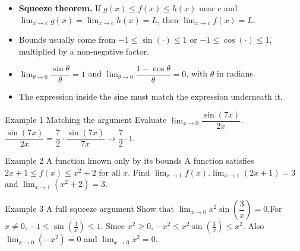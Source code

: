 \documentclass[11pt]{article}
\begin{document}

\begin{ideabox}
\begin{itemize}[leftmargin=*,itemsep=2pt,topsep=2pt]
  \item \textbf{Squeeze theorem.} If $g(x)\le f(x)\le h(x)$ near $c$ and $\displaystyle\lim_{x\to c}g(x)=\displaystyle\lim_{x\to c}h(x)=L$, then $\displaystyle\lim_{x\to c}f(x)=L$.
  \item Bounds usually come from $-1\le\sin(\cdot)\le1$ or $-1\le\cos(\cdot)\le1$, multiplied by a non-negative factor.
  \item $\displaystyle\lim_{\theta\to 0}\dfrac{\sin\theta}{\theta}=1$ and $\displaystyle\lim_{\theta\to 0}\dfrac{1-\cos\theta}{\theta}=0$, with $\theta$ in radians.
  \item The expression inside the sine must match the expression underneath it.
\end{itemize}
\end{ideabox}

\begin{example}{Example 1 \textperiodcentered{} Matching the argument}
Evaluate $\displaystyle\lim_{x\to 0}\dfrac{\sin(7x)}{2x}$.\soln $\dfrac{\sin(7x)}{2x}=\dfrac72\cdot\dfrac{\sin(7x)}{7x}\to\dfrac72\cdot1$.
\end{example}

\begin{example}{Example 2 \textperiodcentered{} A function known only by its bounds}
A function satisfies $2x+1\le f(x)\le x^2+2$ for all $x$. Find $\displaystyle\lim_{x\to 1}f(x)$.\soln $\displaystyle\lim_{x\to 1}(2x+1)=3$ and $\displaystyle\lim_{x\to 1}(x^2+2)=3$.
\end{example}

\begin{example}{Example 3 \textperiodcentered{} A full squeeze argument}
Show that $\displaystyle\lim_{x\to 0}x^2\sin\!\left(\dfrac3x\right)=0$.\soln For $x\neq0$, $-1\le\sin\!\left(\tfrac3x\right)\le1$. Since $x^2\ge0$, $-x^2\le x^2\sin\!\left(\tfrac3x\right)\le x^2$. Also $\displaystyle\lim_{x\to 0}(-x^2)=0$ and $\displaystyle\lim_{x\to 0}x^2=0$.
\end{example}

\newpage
{}
\end{document}
